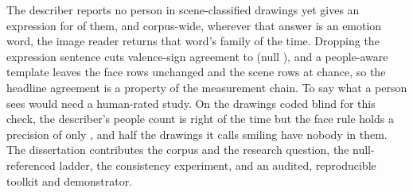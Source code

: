 The describer reports no person in \DescScenePeopleZero{} scene-classified drawings yet gives an expression for \DescScenePeopleZeroExpr{} of them, and corpus-wide, wherever that answer is an emotion word, the image reader returns that word's family \DescCopyStrict{} of the time. Dropping the expression sentence cuts valence-sign agreement to \AblDropExpressionEmoSignObs{} (null \AblDropExpressionEmoSignNull{}), and a people-aware template leaves the face rows unchanged and the scene rows at chance, so the headline agreement is a property of the measurement chain. To say what a person sees would need a human-rated study. On the \HcN{} drawings coded blind for this check, the describer's people count is right \HcPeopleAcc{} of the time but the face rule holds a precision of only \HcFacePrec{}, and half the drawings it calls smiling have nobody in them. The dissertation contributes the corpus and the research question, the null-referenced ladder, the consistency experiment, and an audited, reproducible toolkit and demonstrator.
